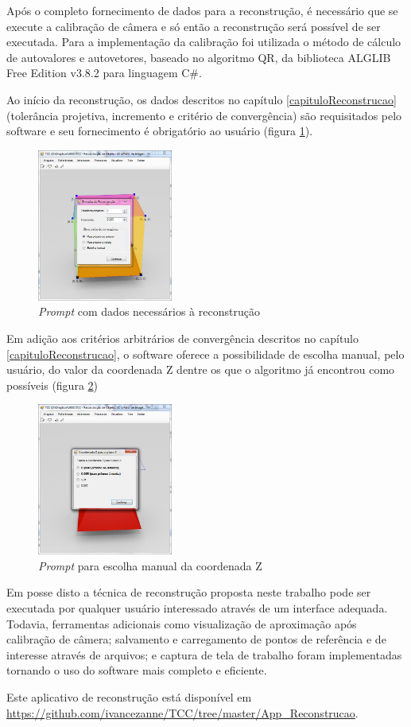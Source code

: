 		Após o completo fornecimento de dados para a reconstrução, é necessário que se execute a calibração de câmera e só então a reconstrução será possível de ser executada. Para a implementação da calibração foi utilizada o método de cálculo de autovalores e autovetores, baseado no algoritmo QR, da biblioteca ALGLIB Free Edition v3.8.2 para linguagem C\#.
		
		Ao início da reconstrução, os dados descritos no capítulo \ref{capituloReconstrucao} (tolerância projetiva, incremento e critério de convergência) são requisitados pelo software e seu fornecimento é obrigatório ao usuário (figura \ref{printAppReconstrucaoReconstrucao}).
		
		\begin{figure}[!htb]
			\centering
			\includegraphics[height=5cm]{imagens/printAppReconstrucaoReconstrucao.png}
			\caption{\textit{Prompt} com dados necessários à reconstrução}
			\label{printAppReconstrucaoReconstrucao}
		\end{figure}
		
		Em adição aos critérios arbitrários de convergência descritos no capítulo \ref{capituloReconstrucao}, o software oferece a possibilidade de escolha manual, pelo usuário, do valor da coordenada Z dentre os que o algoritmo já encontrou como possíveis (figura \ref{printAppReconstrucaoEscolhaManual})
		
		\begin{figure}[!htb]
			\centering
			\includegraphics[height=5cm]{imagens/printAppReconstrucaoEscolhaManual.png}
			\caption{\textit{Prompt} para escolha manual da coordenada Z}
			\label{printAppReconstrucaoEscolhaManual}
		\end{figure}
		
		Em posse disto a técnica de reconstrução proposta neste trabalho pode ser executada por qualquer usuário interessado através de um interface adequada. Todavia, ferramentas adicionais como visualização de aproximação após calibração de câmera; salvamento e carregamento de pontos de referência e de interesse através de arquivos; e captura de tela de trabalho foram implementadas tornando o uso do software mais completo e eficiente.
		
		Este aplicativo de reconstrução está disponível em \url{https://github.com/ivancezanne/TCC/tree/master/App_Reconstrucao}.
		